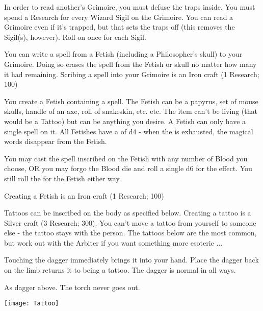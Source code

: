 {In order to read another's Grimoire, you must defuse the traps inside.  You must spend a Research for every Wizard Sigil on the Grimoire.  You can read a Grimoire even if it's trapped, but that sets the traps off (this removes the Sigil(s), however).  Roll on  once for each Sigil.


You can write a spell from a Fetish (including a Philosopher's skull) to your Grimoire.  Doing so erases the spell from the Fetish or skull no matter how many \UD it had remaining.  Scribing a spell into your Grimoire is an Iron craft (1 Research; 100\FE)


You create a Fetish containing a spell.  The Fetish can be a papyrus, set of mouse skulls, handle of an axe, roll of snakeskin, etc. etc.  The item can't be living (that would be a Tattoo) but can be anything you desire.  A Fetish can only have a single spell on it.  All Fetishes have a \UD of d4 - when the \UD is exhausted, the magical words disappear from the Fetish. 

You may cast the spell inscribed on the Fetish with any number of Blood you choose, OR you may forgo the Blood die and roll a single d6 for the effect.  You still roll the \UD for the Fetish either way.

Creating a Fetish is an Iron craft (1 Research; 100\FE)



Tattoos can be inscribed on the body as specified below.  Creating a tattoo is a Silver craft (3 Research; 300\AG).  You can't move a tattoo from yourself to someone else - the tattoo stays with the person.  The tattoos below are the most common, but work out with the Arbiter if you want something more esoteric ...


Touching the dagger immediately brings it into your hand.  Place the dagger back on the limb returns it to being a tattoo.  The dagger is normal in all ways.


As dagger above.  The torch never goes out.

  \begin{center}
  \texttt{[image: Tattoo]}
  \end{center}


}
